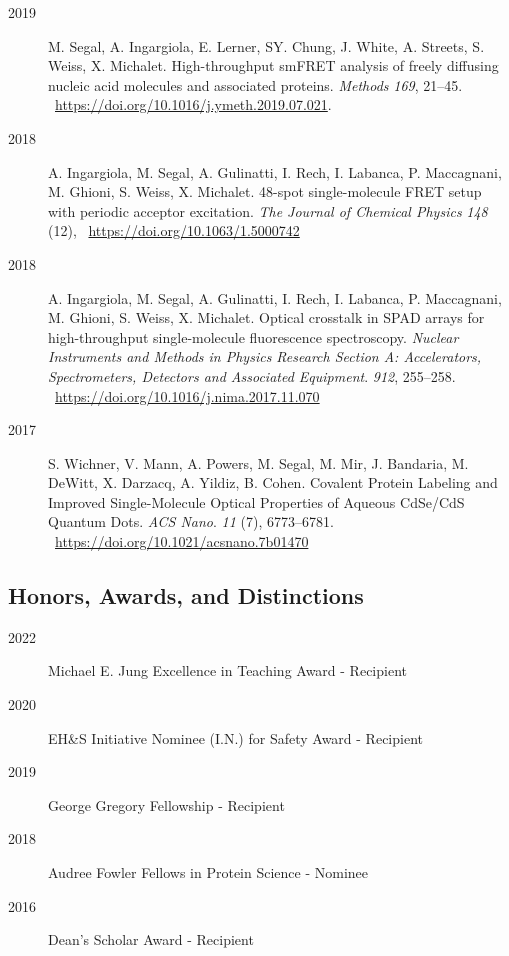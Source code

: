 \begin{description}
    \item[2019] M. Segal, A. Ingargiola, E. Lerner, SY. Chung, J. White, A. Streets, S. Weiss, X. Michalet. High-throughput smFRET analysis of freely diffusing nucleic acid molecules and associated proteins. \textit{Methods} \textit{169}, 21–45. ~\href{https://doi.org/10.1016/j.ymeth.2019.07.021}{https://doi.org/10.1016/j.ymeth.2019.07.021}.
    
    \item[2018] A. Ingargiola, M. Segal, A. Gulinatti, I. Rech, I. Labanca, P. Maccagnani, M. Ghioni, S. Weiss, X. Michalet. 48-spot single-molecule FRET setup with periodic acceptor excitation. \textit{The Journal of Chemical Physics} \textit{148} (12), ~\href{123304.https://doi.org/10.1063/1.5000742}{https://doi.org/10.1063/1.5000742}
    
    \item[2018] A. Ingargiola, M. Segal, A. Gulinatti, I. Rech, I. Labanca, P. Maccagnani, M. Ghioni, S. Weiss, X. Michalet. Optical crosstalk in SPAD arrays for high-throughput single-molecule fluorescence spectroscopy. \textit{Nuclear Instruments and Methods in Physics Research Section A: Accelerators, Spectrometers, Detectors and Associated Equipment}. \textit{912}, 255–258. ~\href{https://doi.org/10.1016/j.nima.2017.11.070}{https://doi.org/10.1016/j.nima.2017.11.070}
    
    \item[2017] S. Wichner, V. Mann, A. Powers, M. Segal, M. Mir, J. Bandaria, M. DeWitt, X. Darzacq, A. Yildiz, B. Cohen. Covalent Protein Labeling and Improved Single-Molecule Optical Properties of Aqueous CdSe/CdS Quantum Dots. \textit{ACS Nano}. \textit{11} (7), 6773–6781. ~\href{https://doi.org/10.1021/acsnano.7b01470}{https://doi.org/10.1021/acsnano.7b01470}
\end{description}
\vspace{1em}

\subsection*{Honors, Awards, and Distinctions}

\begin{description}
    \item[2022] Michael E. Jung Excellence in Teaching Award - Recipient
    \item[2020] EH\&S Initiative Nominee (I.N.) for Safety Award - Recipient
    \item[2019] George Gregory Fellowship - Recipient
    \item[2018] Audree Fowler Fellows in Protein Science - Nominee
    \item[2016] Dean's Scholar Award - Recipient
\end{description}

